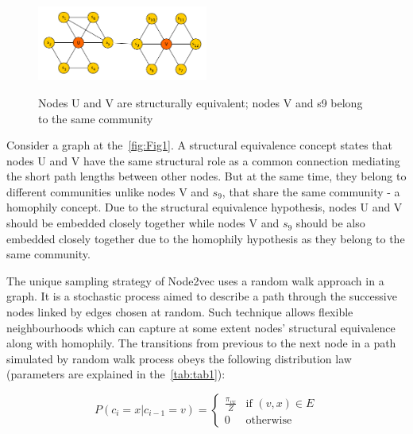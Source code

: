 \begin{figure}[H]
	\centering
	\includegraphics[width=0.5\textwidth]{images/Fig1.pdf}\\
	\caption{Nodes U and V are structurally equivalent; nodes V and s9 belong to the same community}
	\label{fig:Fig1}
\end{figure}

Consider a graph at the~\autoref{fig:Fig1}. A structural equivalence concept states that nodes U and V have the same structural role as a common connection mediating the short path lengths between other nodes. But at the same time, they belong to different communities unlike nodes V and $s_9$, that share the same community - a homophily concept. Due to the structural equivalence hypothesis, nodes U and V should be embedded closely together while nodes V and $s_9$ should be also embedded closely together due to the homophily hypothesis as they belong to the same community.

The unique sampling strategy of Node2vec uses a random walk approach in a graph. It is a stochastic process aimed to describe a path through the successive nodes linked by edges chosen at random. Such technique allows flexible neighbourhoods which can capture at some extent nodes’ structural equivalence along with homophily. The transitions from previous to the next node in a path simulated by random walk process obeys the following distribution law (parameters are explained in the~\autoref{tab:tab1}): 

\begin{equation}
  P(c_i=x | c_{i-1}=v) =
    \begin{cases}
      \frac{\pi_{vx}}{Z} & \text{if $(v,x) \in E$} \\
      0 & \text{otherwise}
    \end{cases}
    \label{eq:equat1}
\end{equation}

